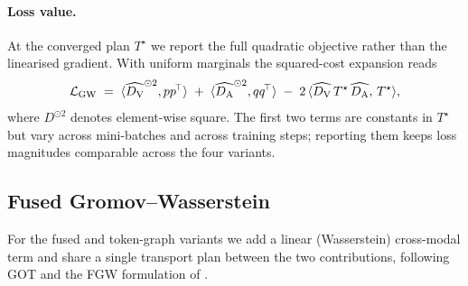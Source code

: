 \paragraph{Loss value.}
At the converged plan $T^{\star}$ we report the full quadratic
objective rather than the linearised gradient. With uniform
marginals the squared-cost expansion reads
\begin{equation}
  \mathcal{L}_{\mathrm{GW}}
  \;=\;
  \langle \widehat{D_{\mathrm{V}}}^{\odot 2}, p p^{\!\top} \rangle
  \;+\;
  \langle \widehat{D_{\mathrm{A}}}^{\odot 2}, q q^{\!\top} \rangle
  \;-\;
  2\,\langle \widehat{D_{\mathrm{V}}}\, T^{\star}\, \widehat{D_{\mathrm{A}}},\, T^{\star} \rangle,
  \label{eq:gw_value}
\end{equation}
where $D^{\odot 2}$ denotes element-wise square. The first two
terms are constants in $T^{\star}$ but vary across mini-batches and
across training steps; reporting them keeps loss magnitudes
comparable across the four variants.

\subsection{Fused Gromov--Wasserstein}
\label{sec:methodology:fgw}

For the fused and token-graph variants we add a
linear (Wasserstein) cross-modal term and share a single transport
plan between the two contributions, following GOT
\citep{chen_2020_graph} and the FGW formulation of
\citet{vayer_2019_optimal, vayer_2019_fused}.

